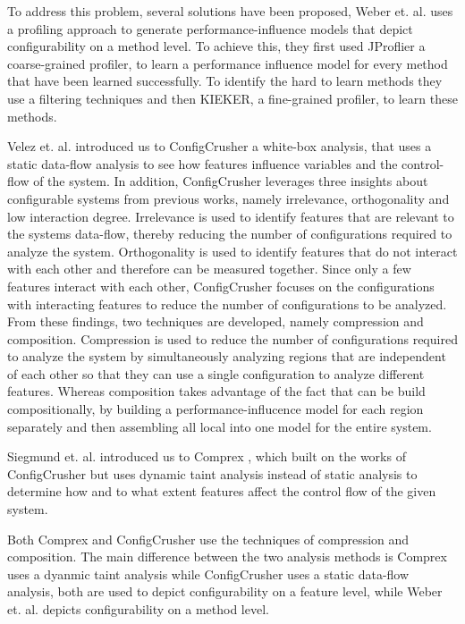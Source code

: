 To address this problem, several solutions have been proposed, Weber et. al. \cite{White-box-Profiling} uses a profiling approach to generate 
performance-influence models that depict configurability on a method level. To achieve this, they first used JProflier a coarse-grained profiler,
to learn a performance influence model for every method that have been learned successfully. 
To identify the hard to learn methods they use a filtering techniques and then KIEKER, a fine-grained profiler, to learn these methods.

Velez et. al. introduced us to ConfigCrusher \cite{ConfigCrusher} a white-box analysis, that uses a static data-flow analysis to see how features influence 
variables and the control-flow of the system. In addition, ConfigCrusher leverages three insights about configurable systems from previous works, namely
irrelevance, orthogonality and low interaction degree. Irrelevance is used to identify features that are relevant to the systems data-flow, thereby
reducing the number of configurations required to analyze the system. Orthogonality is used to identify features that do not interact with each other and
therefore can be measured together. Since only a few features interact with each other, ConfigCrusher focuses on the configurations with interacting 
features to reduce the number of configurations to be analyzed. 
From these findings, two techniques are developed, namely compression and composition.
Compression is used to reduce the number of configurations required to analyze the system
by simultaneously analyzing regions that are independent of each other so that they can use a single configuration to 
analyze different features. 
Whereas composition takes advantage of the fact that \perfInfluenceModel can be build compositionally, by building a performance-influcence model for each 
region separately and then assembling all local \perfInfluenceModel into one model for the entire system.

Siegmund et. al. introduced us to Comprex \cite{Comprex}, which built on the works of ConfigCrusher but uses dynamic taint analysis instead of static
analysis to determine how and to what extent features affect the control flow of the given system.

Both Comprex and ConfigCrusher use the techniques of compression and composition. The main difference between the two analysis methods is Comprex 
uses a dyanmic taint analysis while ConfigCrusher uses a static data-flow analysis, both are used to depict configurability on a feature level, 
while Weber et. al. depicts configurability on a method level. 

